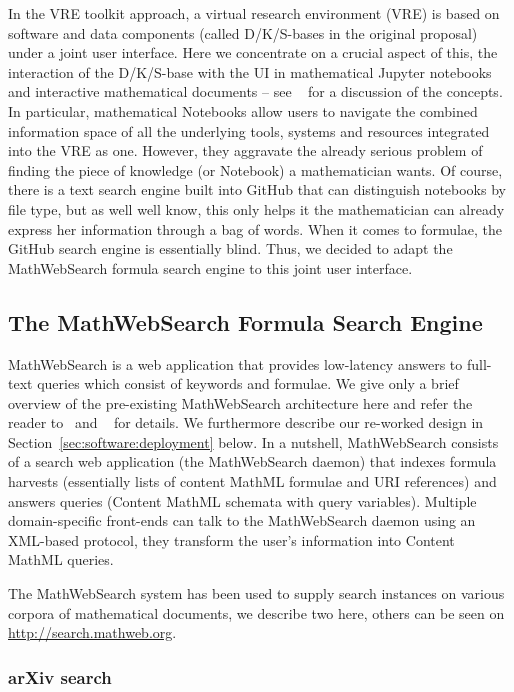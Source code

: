 \def\MWS{MathWebSearch\xspace}

In the \pn VRE toolkit approach, a virtual research environment (VRE) is based on software and data components (called D/K/S-bases in the original proposal) under a joint user interface.
Here we concentrate on a crucial aspect of this, the interaction of the D/K/S-base with the UI in mathematical Jupyter notebooks and interactive mathematical documents -- see ~\cite{ODK-D4.2} for a discussion of the concepts.
In particular, mathematical Notebooks allow users to navigate the combined information space of all the underlying tools, systems and resources integrated into the VRE as one. 
However, they aggravate the already serious problem of finding the piece of knowledge (or Notebook) a mathematician wants.
Of course, there is a text search engine built into  GitHub that can distinguish notebooks by file type, but as well well know, this only helps it the mathematician can already express her information through a bag of words.
When it comes to formulae, the GitHub search engine is essentially blind. 
Thus, we decided to adapt the \MWS formula search engine to this \pn joint user interface. 

\subsection{The \MWS Formula Search Engine}

\MWS is a web application that provides low-latency answers to full-text queries which consist of keywords and formulae.
We give only a brief overview of the pre-existing \MWS architecture here and refer the reader to~\cite{ProKoh:mwssofse12} and ~\cite{ODK-D6.1} for details. 
We furthermore describe our re-worked design in Section~\ref{sec:software:deployment} below.
In a nutshell, \MWS consists of a search web application (the \MWS daemon) that indexes formula harvests (essentially lists of content MathML formulae and URI references) and answers queries (Content MathML schemata with query variables).
Multiple domain-specific front-ends can talk to the \MWS daemon using an XML-based protocol, they transform the user's information into Content MathML queries. 

The \MWS system has been used to supply search instances on various corpora of mathematical documents, we describe two here, others can be seen on \url{http://search.mathweb.org}. 

\subsubsection{arXiv search}

